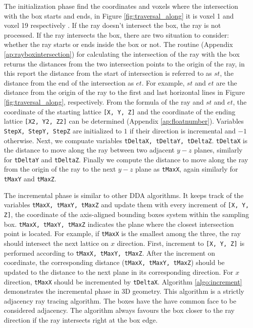 The initialization phase find the coordinates and voxels where the intersection with the box starts and ends, in Figure \ref{fig:traversal_along} it is voxel 1 and voxel 19 respectively \cite{smits}. If the ray doesn't intersect the box, the ray is not processed. If the ray intersects the box, there are two situation to consider: whether the ray starts or ends inside the box or not. The routine (Appendix \ref{ap:rayboxintersection}) for calculating the intersection of the ray with the box returns the distances from the two intersection points to the origin of the ray, in this report the distance from the start of intersection is referred to as $st$, the distance from the end of the intersection as $et$. For example, $st$ and $et$ are the distance from the origin of the ray to the first and last horizontal lines in Figure \ref{fig:traversal_along}, respectively. From the formula of the ray and $st$ and $et$, the coordinate of the starting lattice \texttt{[X, Y, Z]} and the coordinate of the ending lattice \texttt{[X2, Y2, Z2]} can be determined (Appendix \ref{ap:floatnumber}). Variables \texttt{StepX, StepY, StepZ} are initialized to $1$ if their direction is incremental and $-1$ otherwise. Next, we compuate variables \texttt{tDeltaX, tDeltaY, tDeltaZ}. \texttt{tDeltaX} is the distance to move along the ray between two adjacent $y-z$ planes, similarly for \texttt{tDeltaY} and \texttt{tDeltaZ}. Finally we compute the distance to move along the ray from the origin of the ray to the next $y-z$ plane as \texttt{tMaxX}, again similarly for \texttt{tMaxY} and \texttt{tMaxZ}.

The incremental phase is similar to other DDA algorithms. It keeps track of the variables \texttt{tMaxX, tMaxY, tMaxZ} and update them with every increment of \texttt{[X, Y, Z]}, the coordinate of the axis-aligned bounding boxes system within the sampling box. \texttt{tMaxX, tMaxY, tMaxZ} indicates the plane where the closest intersection point is located. For example, if \texttt{tMaxX} is the smallest among the three, the ray should intersect the next lattice on $x$ direction. First, increment to \texttt{[X, Y, Z]} is performed according to \texttt{tMaxX, tMaxY, tMaxZ}. After the increment on coordinate, the corresponding distance (\texttt{tMaxX, tMaxY, tMaxZ}) should be updated to the distance to the next plane in its corresponding direction. For $x$ direction, \texttt{tMaxX} should be incremented by \texttt{tDeltaX}. Algorithm \ref{algo:increment} demonstrates the incremental phase in 3D geometry. This algorithm is a strictly adjacency ray tracing algorithm. The boxes have the have common face to be considered adjacency. The algorithm always favours the box closer to the ray direction if the ray intersects right at the box edge.

